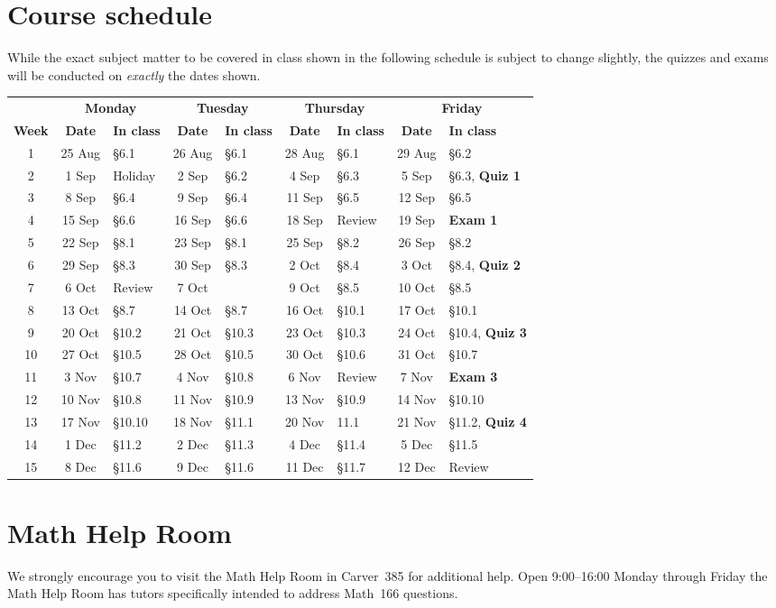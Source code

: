 \documentclass[11pt]{article}
\begin{document}
\section{Course schedule}\label{Schedule} While the exact subject
matter to be covered in class shown in the following schedule is
subject to change slightly, the quizzes and exams will be conducted
on {\em exactly} the dates shown.

\begin{tabular}{c|cl|cl|cl|cl}
&\multicolumn{2}{c|}{\bf Monday}
&\multicolumn{2}{c|}{\bf Tuesday}
&\multicolumn{2}{c|}{\bf Thursday}
&\multicolumn{2}{c}{\bf Friday}\\
{\bf Week}&{\bf Date}&{\bf In class}
&{\bf Date}&{\bf In class}&{\bf Date}&{\bf In class}
&{\bf Date}&{\bf In class}\\\toprule
1&25 Aug&\S6.1&26 Aug&\S6.1&28 Aug&\S6.1&29 Aug&\S6.2\\\midrule
2&1 Sep&Holiday&2 Sep&\S6.2&4 Sep&\S6.3&5 Sep&\S6.3, {\bf Quiz 1}\\\midrule
3&8 Sep&\S6.4&9 Sep&\S6.4&11 Sep&\S6.5&12 Sep&\S6.5\\\midrule
4&15 Sep&\S6.6&16 Sep&\S6.6&18 Sep&Review&19 Sep&{\bf Exam 1}\\\midrule
5&22 Sep&\S8.1&23 Sep&\S8.1&25 Sep&\S8.2&26 Sep&\S8.2\\\midrule
6&29 Sep&\S8.3&30 Sep&\S8.3&2 Oct&\S8.4&3 Oct&\S8.4, {\bf Quiz 2}\\\midrule
7&6 Oct&Review&7 Oct&&9 Oct&\S8.5&10 Oct&\S8.5\\\midrule
8&13 Oct&\S8.7&14 Oct&\S8.7&16 Oct&\S10.1&17 Oct&\S10.1\\\midrule
9&20 Oct&\S10.2&21 Oct&\S10.3&23 Oct&\S10.3&24 Oct&\S10.4, {\bf Quiz 3}\\\midrule
10&27 Oct&\S10.5&28 Oct&\S10.5&30 Oct&\S10.6&31 Oct&\S10.7\\\midrule
11&3 Nov&\S10.7&4 Nov&\S10.8&6 Nov&Review&7 Nov&{\bf Exam 3}\\\midrule
12&10 Nov&\S10.8&11 Nov&\S10.9&13 Nov&\S10.9&14 Nov&\S10.10\\\midrule
13&17 Nov&\S10.10&18 Nov&\S11.1&20 Nov&11.1&21 Nov&\S11.2, {\bf Quiz 4}\\\midrule
14&1 Dec&\S11.2&2 Dec&\S11.3&4 Dec&\S11.4&5 Dec&\S11.5\\\midrule
15&8 Dec&\S11.6&9 Dec&\S11.6&11 Dec&\S11.7&12 Dec&Review\\\midrule
\end{tabular}

\section{Math Help Room}\label{MathCenter}
We strongly encourage you to visit the Math Help Room
in Carver~385 for additional help.
Open 9:00--16:00 Monday through Friday the Math Help Room
has tutors specifically intended to address Math~166 questions.
\end{document}
